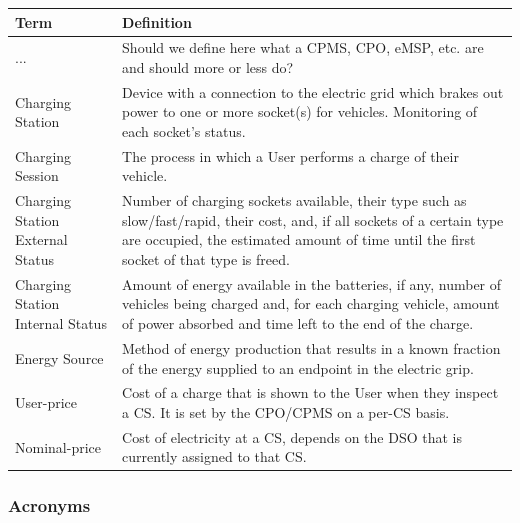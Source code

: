 \documentclass[11pt]{article}
\begin{document}
\begin{table}[H]
    \centering
    \setlength{\tabcolsep}{18pt}
    \renewcommand{\arraystretch}{1.2}
    \begin{tabularx}{\textwidth}{|>{\centering\hsize=0.3\hsize}X|>{\hsize=1.7\hsize}X|}
        \hline
        \textbf{Term} & \textbf{Definition} \\
        \hline
        ... & Should we define here what a CPMS, CPO, eMSP, etc. are and should more or less do? \\
        \hline
        Charging Station & Device with a connection to the electric grid which brakes out power to one or more socket(s) for vehicles. Monitoring of each socket's status. \\
        \hline
        Charging Session & The process in which a User performs a charge of their vehicle. \\
        \hline
        Charging Station External Status & Number of charging sockets available, their type such as slow/fast/rapid, their cost, and, if all sockets of a certain type are occupied, the estimated amount of time until the first socket of that type is freed. \\
        \hline
        Charging Station Internal Status & Amount of energy available in the batteries, if any, number of vehicles being charged and, for each charging vehicle, amount of power absorbed and time left to the end of the charge. \\
        \hline
        Energy Source & Method of energy production that results in a known fraction of the energy supplied to an endpoint in the electric grip. \\
        \hline
        User-price & Cost of a charge that is shown to the User when they inspect a CS. It is set by the CPO/CPMS on a per-CS basis. \\
        \hline
        Nominal-price & Cost of electricity at a CS, depends on the DSO that is currently assigned to that CS. \\
        \hline
    \end{tabularx}
    \label{tab:definitions}
\end{table}

\subsubsection{Acronyms}
\end{document}
